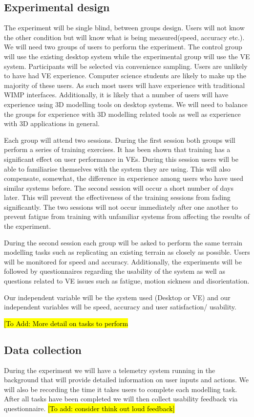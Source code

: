 \documentclass{sig-alternate-05-2015}
\begin{document}
\subsection{Experimental design}
The experiment will be single blind, between groups design. Users will not know the other condition but will know what is being measured(speed, accuracy etc.). We will need two groups of users to perform the experiment. The control group will use the existing desktop system while the experimental group will use the VE system. Participants will be selected via convenience sampling. Users are unlikely to have had VE experience. Computer science students are likely to make up the majority of these users. As such most users will have experience with traditional WIMP interfaces. Additionally, it is likely that a number of users will have experience using 3D modelling tools on desktop systems. We will need to balance the groups for experience with 3D modelling related tools as well as experience with 3D applications in general.

Each group will attend two sessions. During the first session both groups will perform a series of training exercises. It has been shown that training has a significant effect on user performance in VEs\cite{Schultheis2012}. During this session users will be able to familiarise themselves with the system they are using. This will also compensate, somewhat, the difference in experience among users who have used similar systems before. The second session will occur a short number of days later. This will prevent the effectiveness of the training sessions from fading significantly. The two sessions will not occur immediately after one another to prevent fatigue from training with unfamiliar systems from affecting the results of the experiment.

During the second session each group will be asked to perform the same terrain modelling tasks such as replicating an existing terrain as closely as possible. Users will be monitored for speed and accuracy. Additionally, the experiments will be followed by questionnaires regarding the usability of the system as well as questions related to VE issues such as fatigue, motion sickness and disorientation.

Our independent variable will be the system used (Desktop or VE) and our independent variables will be speed, accuracy and user satisfaction/ usability.

\hl{[To Add: More detail on tasks to perform}
\subsection{Data collection}
During the experiment we will have a telemetry system running in the background that will provide detailed information on user inputs and actions. We will also be recording the time it takes users to complete each modelling task. After all tasks have been completed we will then collect usability feedback via questionnaire.
\hl{[To add: consider think out loud feedback]}
\end{document}
